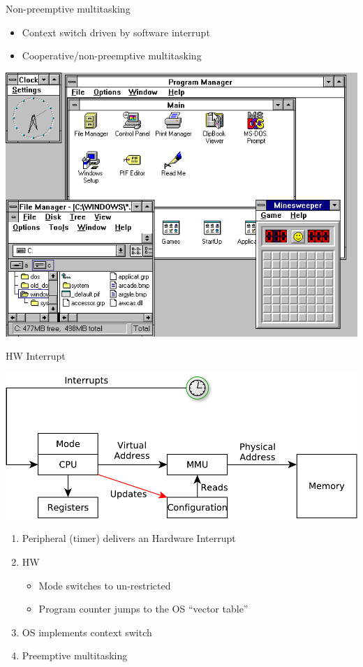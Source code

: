 \documentclass{beamer}
\begin{document}
\begin{frame}{Non-preemptive multitasking}
  \begin{itemize}
  \item Context switch driven by software interrupt
  \item Cooperative/non-preemptive multitasking
  \end{itemize}
  \begin{center}
     {
  \includegraphics[width=0.5\linewidth]{windows3-1}
}
  \end{center}
\end{frame}

\begin{frame}{HW Interrupt}
  \begin{center}
  \includegraphics[width=0.7\linewidth]{timer}
  \end{center}
  \begin{enumerate}
  \item<1-> Peripheral (timer) delivers an Hardware Interrupt
  \item<2-> HW
  \begin{itemize}
    \item Mode switches to un-restricted
    \item Program counter jumps to the OS ``vector table''
  \end{itemize}
  \item<3-> OS implements context switch
  \item<4-> Preemptive multitasking
\end{enumerate}
\end{frame}
\end{document}
